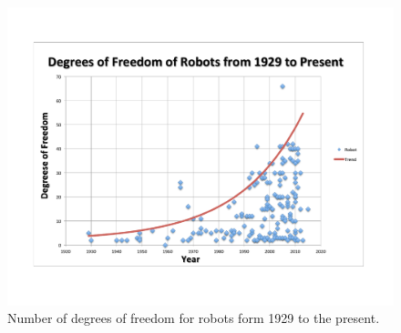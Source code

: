 \begin{figure}[thpb]
  \centering
      \includegraphics[width=0.8\columnwidth]{./pix/robotsDOF.pdf}
\caption{Number of degrees of freedom for robots form 1929 to the present.}
\label{fig:numOfRobots}
\end{figure}





